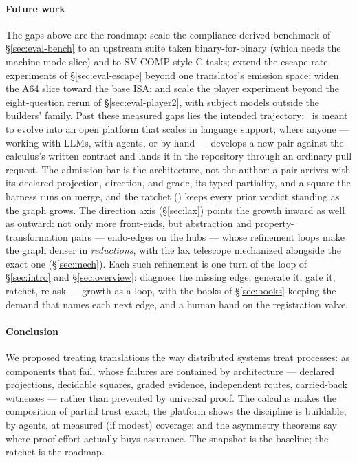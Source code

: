 \paragraph{Future work}
The gaps above are the roadmap: scale the compliance-derived benchmark
of \S\ref{sec:eval-bench} to an upstream suite taken binary-for-binary
(which needs the machine-mode slice) and to SV-COMP-style C tasks;
extend the escape-rate experiments of \S\ref{sec:eval-escape} beyond
one translator's emission space; widen the A64 slice toward the
base ISA; and scale the player experiment beyond the eight-question
rerun of \S\ref{sec:eval-player2}, with subject models outside the
builders' family. Past these measured gaps
lies the intended trajectory: \hg\ is meant to evolve into an open
platform that scales in language support, where anyone --- working with
LLMs, with agents, or by hand --- develops a new pair against the
calculus's written contract and lands it in the repository through an
ordinary pull request. The admission bar is the architecture, not the
author: a pair arrives with its declared projection\ifarxiv{},
direction,\fi{} and grade, its typed partiality, and a square the
harness runs on merge, and the ratchet () keeps
every prior verdict standing as the graph grows.\ifarxiv{} The
direction axis
(\S\ref{sec:lax}) points the growth inward as well as outward: not only
more front-ends, but abstraction and property-transformation pairs ---
endo-edges on the hubs --- whose refinement loops make the graph denser
in \emph{reductions}, with the lax telescope mechanized alongside
the exact one (\S\ref{sec:mech}). Each such refinement is one turn of
the loop of \S\ref{sec:intro} and \S\ref{sec:overview}: diagnose the
missing edge, generate it, gate it, ratchet, re-ask --- growth as a
loop, with the books of \S\ref{sec:books} keeping the demand that
names each next edge, and a human hand on the registration
valve.\fi

\paragraph{Conclusion}
We proposed treating translations the way distributed systems treat
processes: as components that fail, whose failures are contained by
architecture --- declared projections, decidable squares, graded
evidence, independent routes, carried-back witnesses --- rather than
prevented by universal proof. The calculus makes the composition of
partial trust exact; the platform shows the discipline is buildable, by
agents, at measured (if modest) coverage; and the asymmetry theorems say
where proof effort actually buys assurance. The snapshot is the
baseline; the ratchet is the roadmap.

